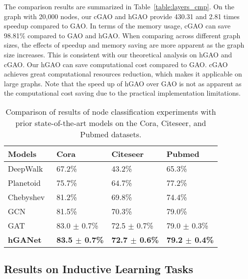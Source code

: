 \documentclass[sigconf]{acmart}
\begin{document}
The comparison results are summarized in Table~\ref{table:layers_cmp}. On the
graph with 20,000 nodes, our cGAO and hGAO provide 430.31 and 2.81 times
speedup compared to GAO. In terms of the memory usage, cGAO can save 98.81\%
compared to GAO and hGAO. When comparing across different graph sizes, the
effects of speedup and memory saving are more apparent as the graph size
increases. This is consistent with our theoretical analysis on hGAO and cGAO.
Our hGAO can save computational cost compared to GAO. cGAO achieves great
computational resources reduction, which makes it applicable on large graphs.
Note that the speed up of hGAO over GAO is not as apparent as the
computational cost saving due to the practical implementation limitations.

\begin{table}[t]
\centering \caption{Comparison of results of node classification experiments with
prior state-of-the-art models on the Cora, Citeseer, and Pubmed datasets.}
\label{table:trans}
\begin{tabularx}{\columnwidth}{  X YYY  }
    \hline
    \textbf{Models} & \textbf{Cora} & \textbf{Citeseer} & \textbf{Pubmed} \\ \hline\hline
    DeepWalk~\cite{perozzi2014deepwalk}            & 67.2\% & 43.2\%  & 65.3\%   \\ \hline
    Planetoid~\cite{yang2016revisiting}            & 75.7\% & 64.7\%  & 77.2\%   \\ \hline
    Chebyshev~\cite{defferrard2016convolutional}   & 81.2\% & 69.8\%  & 74.4\%   \\ \hline
    GCN~\cite{kipf2016semi}                        & 81.5\% & 70.3\%  & 79.0\%   \\ \hline
    GAT~\cite{velivckovic2017graph}                & 83.0 $\pm$ 0.7\% & 72.5 $\pm$ 0.7\% & 79.0 $\pm$ 0.3\% \\ \hline
\textbf{hGANet}                             & \textbf{83.5 $\pm$ 0.7\%}
                                                & \textbf{72.7 $\pm$ 0.6\%}
                                                & \textbf{79.2 $\pm$ 0.4\%} \\ \hline
    \hline
\end{tabularx}
\end{table}

\subsection{Results on Inductive Learning Tasks}
\end{document}
